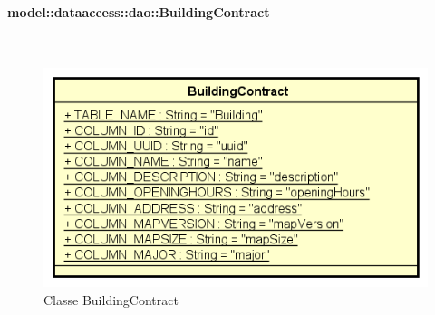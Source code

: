 \documentclass[../DefinizioneDiProdotto.tex]{subfiles}
\begin{document}
\paragraph{model::dataaccess::dao::BuildingContract}
\
\begin{figure}[H]
	\centering
	\includegraphics[width=\maxwidth]{img/BuildingContract.png}
	\caption{Classe BuildingContract}\label{fig:model::dataaccess::dao::BuildingContract} 
\end{figure}
\end{document}
